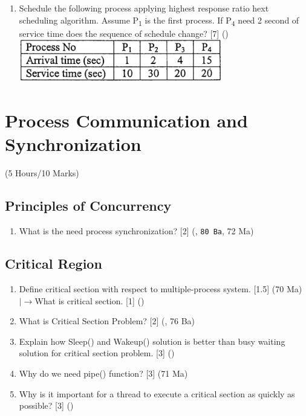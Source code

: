 \documentclass[12pt]{article}
\newcommand{\lb}{\\$\left|\rightarrow\right.$}
\newcommand{\sub}[1]{\textsubscript{#1}}
\begin{document}
\begin{enumerate}
			\item Schedule the following process applying highest response ratio hext scheduling algorithm. Assume P\sub{1} is the first process. If P\sub{4} need 2 second of service time does the sequence of schedule change? \hfill [7] ()\\
			\includegraphics[width=3.5in]{./pics/os_24}
		\end{enumerate}

	\pagebreak
\section{Process Communication and Synchronization}
	\begin{center}(5 Hours/10 Marks)\end{center}
	\subsection{Principles of Concurrency}
		\begin{enumerate}[noitemsep, topsep=0pt]
			\item What is the need process synchronization? \hfill [2] (, \texttt{80 Ba}, 72 Ma)
		\end{enumerate}
		
	\subsection{Critical Region}
		\begin{enumerate}[noitemsep, topsep=0pt]
			\item Define critical section with respect to multiple-process system. \hfill [1.5] (70 Ma)
			\lb What is critical section. \hfill [1] ()
			
			\item What is Critical Section Problem? \hfill [2] (, 76 Ba)
			
			\item Explain how Sleep() and Wakeup() solution is better than busy waiting solution for critical section problem. \hfill [3] ()
			
			\item Why do we need pipe() function? \hfill [3] (71 Ma)
			
			\item Why is it important for a thread to execute a critical section as quickly as possible? \hfill [3] ()
		\end{enumerate}
		
\end{document}
